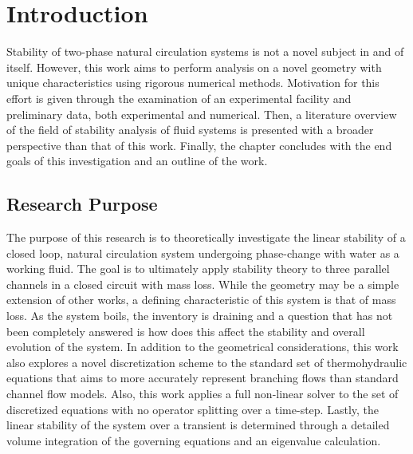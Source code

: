 \documentclass[12pt]{../UWMadThesis}
\begin{document}
\chapter{Introduction}

Stability of two-phase natural circulation systems is not a novel subject in and of itself.
However, this work aims to perform analysis on a novel geometry with unique characteristics using rigorous numerical methods.
Motivation for this effort is given through the examination of an experimental facility and preliminary data, both experimental and numerical.
Then, a literature overview of the field of stability analysis of fluid systems is presented with a broader perspective than that of this work.
Finally, the chapter concludes with the end goals of this investigation and an outline of the work.


\iffalse

\newpage



\section{Research Purpose}\label{Section:Purpose}

The purpose of this research is to theoretically investigate the linear stability of a closed loop, natural circulation system undergoing phase-change with water as a working fluid.
The goal is to ultimately apply stability theory to three parallel channels in a closed circuit with mass loss.
While the geometry may be a simple extension of other works, a defining characteristic of this system is that of mass loss.
As the system boils, the inventory is draining and a question that has not been completely answered is how does this affect the stability and overall evolution of the system.
In addition to the geometrical considerations, this work also explores a novel discretization scheme to the standard set of thermohydraulic equations that aims to more accurately represent branching flows than standard channel flow models.
Also, this work applies a full non-linear solver to the set of discretized equations with no operator splitting over a time-step.
Lastly, the linear stability of the system over a transient is determined through a detailed volume integration of the governing equations and an eigenvalue calculation.
\end{document}
